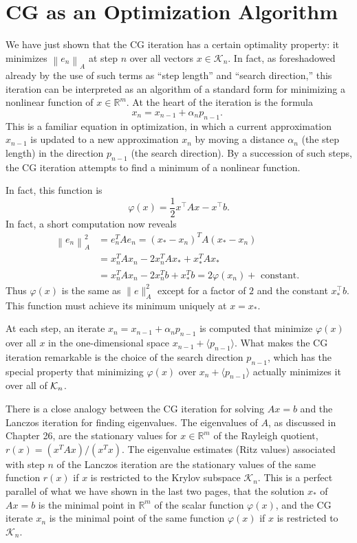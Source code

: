 \section{CG as an Optimization Algorithm} 
We have just shown that the CG iteration has a certain optimality property: it minimizes $\left\|e_n\right\|_A$ at step $n$ over all vectors $x \in \mathcal{K}_n$. In fact, as foreshadowed already by the use of such terms as ``step length'' and ``search direction,'' this iteration can be interpreted as an algorithm of a standard form for minimizing a nonlinear function of $x \in \mathbb{R}^m$. At the heart of the iteration is the formula
$$
x_n=x_{n-1}+\alpha_n p_{n-1} \text {. }
$$
This is a familiar equation in optimization, in which a current approximation $x_{n-1}$ is updated to a new approximation $x_n$ by moving a distance $\alpha_n$ (the step length) in the direction $p_{n-1}$ (the search direction). By a succession of such steps, the CG iteration attempts to find a minimum of a nonlinear function.

In fact, this function is 
\begin{equation}
\label{eq: CG optimize function}
    \varphi(x) = \frac{1}{2}x^\top Ax  - x^\top b. 
\end{equation}
In fact, a short computation now reveals 
\[
    \begin{aligned}
        \left\|e_n\right\|_A^2 & =e_n^T A e_n=\left(x_*-x_n\right)^T A\left(x_*-x_n\right) \\
        & =x_n^T A x_n-2 x_n^T A x_*+x_*^T A x_* \\
        & =x_n^T A x_n-2 x_n^T b+x_*^T b=2 \varphi\left(x_n\right)+\text { constant. }
        \end{aligned}
\]
Thus $ \varphi(x) $ is the same as $ \|e\|_A^{2} $ except for a factor of $ 2 $ and the constant $ x_*^\top b $. This function must achieve its minimum uniquely at $ x=x_* $.  

At each step, an iterate $ x_n = x_{n-1} + \alpha _n p_{n-1} $ is computed that minimize $ \varphi(x) $ over all $ x $ in the one-dimensional space $ x_{n-1}+ \langle p_{n-1} \rangle $. What makes the CG iteration remarkable is the choice of the search direction $ p_{n-1} $, which has the special property that minimizing $ \varphi(x) $ over $ x_n + \langle p_{n-1} \rangle  $ actually minimizes it over all of $ \mathcal{K}_n $. 

There is a close analogy between the CG iteration for solving $A x=b$ and the Lanczos iteration for finding eigenvalues. The eigenvalues of $A$, as discussed in Chapter 26, are the stationary values for $x \in \mathbb{R}^m$ of the Rayleigh quotient, $r(x)=\left(x^T A x\right) /\left(x^T x\right)$. The eigenvalue estimates (Ritz values) associated with step $n$ of the Lanczos iteration are the stationary values of the same function $r(x)$ if $x$ is restricted to the Krylov subspace $\mathcal{K}_n$. This is a perfect parallel of what we have shown in the last two pages, that the solution $x_*$ of $A x=b$ is the minimal point in $\mathbb{R}^m$ of the scalar function $\varphi(x)$, and the CG iterate $x_n$ is the minimal point of the same function $\varphi(x)$ if $x$ is restricted to $\mathcal{K}_n$.

